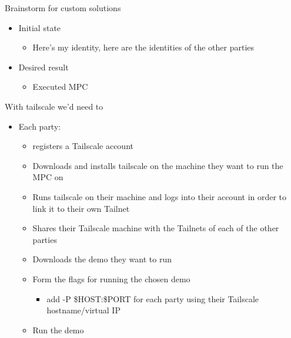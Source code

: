 \begin{frame}{Brainstorm for custom solutions}
\protect\hypertarget{brainstorm-for-custom-solutions}{}
\begin{itemize}
\tightlist
\item
  Initial state

  \begin{itemize}
  \tightlist
  \item
    Here's my identity, here are the identities of the other parties
  \end{itemize}
\item
  Desired result

  \begin{itemize}
  \tightlist
  \item
    Executed MPC
  \end{itemize}
\end{itemize}

With tailscale we'd need to

\begin{itemize}
\tightlist
\item
  Each party:

  \begin{itemize}
  \tightlist
  \item
    registers a Tailscale account
  \item
    Downloads and installs tailscale on the machine they want to run the
    MPC on
  \item
    Runs tailscale on their machine and logs into their account in order
    to link it to their own Tailnet
  \item
    Shares their Tailscale machine with the Tailnets of each of the
    other parties
  \item
    Downloads the demo they want to run
  \item
    Form the flags for running the chosen demo

    \begin{itemize}
    \tightlist
    \item
      add -P \$HOST:\$PORT for each party using their Tailscale
      hostname/virtual IP
    \end{itemize}
  \item
    Run the demo
  \end{itemize}
\end{itemize}
\end{frame}

